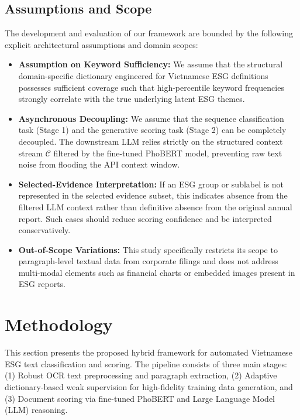 \documentclass{article}
\theoremstyle{plain}
\theoremstyle{definition}
\theoremstyle{remark}
\begin{document}
\subsection{Assumptions and Scope}
The development and evaluation of our framework are bounded by the following explicit architectural assumptions and domain scopes:
\begin{itemize}
    \item \textbf{Assumption on Keyword Sufficiency:} We assume that the structural domain-specific dictionary engineered for Vietnamese ESG definitions possesses sufficient coverage such that high-percentile keyword frequencies strongly correlate with the true underlying latent ESG themes.
    \item \textbf{Asynchronous Decoupling:} We assume that the sequence classification task (Stage 1) and the generative scoring task (Stage 2) can be completely decoupled. The downstream LLM relies strictly on the structured context stream $\mathcal{C}$ filtered by the fine-tuned PhoBERT model, preventing raw text noise from flooding the API context window.
    \item \textbf{Selected-Evidence Interpretation:} If an ESG group or sublabel is not represented in the selected evidence subset, this indicates absence from the filtered LLM context rather than definitive absence from the original annual report. Such cases should reduce scoring confidence and be interpreted conservatively.
    \item \textbf{Out-of-Scope Variations:} This study specifically restricts its scope to paragraph-level textual data from corporate filings and does not address multi-modal elements such as financial charts or embedded images present in ESG reports.
\end{itemize}

\section{Methodology}
\label{sec:methodology}

This section presents the proposed hybrid framework for automated Vietnamese ESG text classification and scoring. The pipeline consists of three main stages: (1) Robust OCR text preprocessing and paragraph extraction, (2) Adaptive dictionary-based weak supervision for high-fidelity training data generation, and (3) Document scoring via fine-tuned PhoBERT and Large Language Model (LLM) reasoning.
\end{document}
